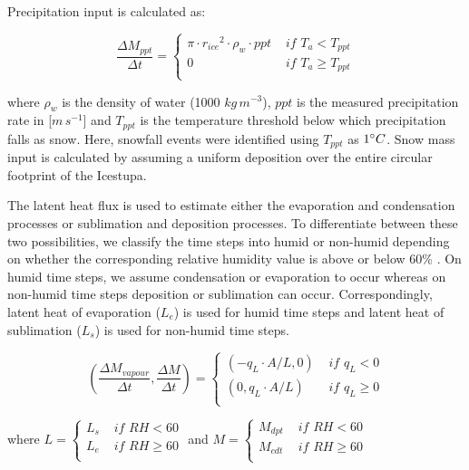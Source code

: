 \documentclass[utf8]{frontiersSCNS} %
\begin{document}
Precipitation input is calculated as:

\begin{equation} \frac{\Delta M_{ppt}}{\Delta t}  = \left\{ \begin{array}{ll} \pi \cdot {r_{ice}}^2 \cdot
\rho_{w}\cdot ppt& \textit{ if } T_{a} < T_{ppt} \\ 0 & \textit{ if } T_{a} \geq T_{ppt} \\ \end{array} \right.
    \end{equation}

where $\rho_{w}$ is the density of water (1000 $kg\,m^{-3}$), $ppt$ is the measured precipitation rate in
[$m\,s^{-1}$] and $T_{ppt}$ is the temperature threshold below which precipitation falls as snow. Here, snowfall
events were identified using $T_{ppt}$ as $1 \degree C$. Snow mass input is calculated by assuming a uniform
deposition over the entire circular footprint of the Icestupa. 

The latent heat flux is used to estimate either the evaporation and condensation processes or sublimation and
deposition processes.  To differentiate between these two possibilities, we classify the time steps into humid or
non-humid depending on whether the corresponding relative humidity value is above or below 60\% \citep{Stigter_2018}.
On humid time steps, we assume condensation or evaporation to occur whereas on non-humid time steps deposition or
sublimation can occur.  Correspondingly, latent heat of evaporation ($L_e$) is used for humid time steps and latent
heat of sublimation ($L_s$) is used for non-humid time steps. 

\begin{equation} (\frac{\Delta M_{vapour}}{\Delta t}, \frac{\Delta M}{\Delta t}) = \left\{ \begin{array}{ll}
(-q_{L} \cdot A /L,0) & \textit{ if } q_{L}<0 \\ (0,q_{L} \cdot A /L) & \textit{ if } q_{L}\geq0 \\ \end{array}
\right.  \label{eqn:vap1} \end{equation}

where $ L = \left\{ \begin{array}{ll} L_s & \textit{ if } RH<60 \\ L_e & \textit{ if } RH\geq60\\  \end{array} \right.
$ and $ M = \left\{ \begin{array}{ll} M_{dpt} & \textit{ if } RH<60 \\ M_{cdt} & \textit{ if } RH\geq60\\  \end{array} \right.
$
\end{document}
